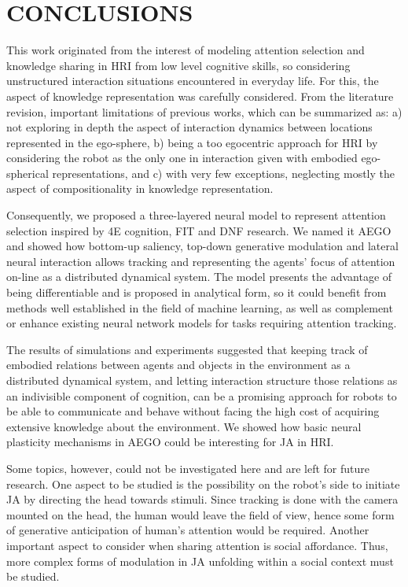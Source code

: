 \documentclass[letterpaper, 10 pt, conference]{ieeeconf}  %
\begin{document}
	\section{CONCLUSIONS}
	\label{sec:conclusions}
	
	This work originated from the interest of modeling attention selection and knowledge sharing in HRI from low level cognitive skills, so considering unstructured interaction situations encountered in everyday life. For this, the aspect of knowledge representation was carefully considered. From the literature revision, important limitations of previous works, which can be summarized as: a) not exploring in depth the aspect of interaction dynamics between locations represented in the ego-sphere, b) being a too egocentric approach for HRI by considering the robot as the only one in interaction given with embodied ego-spherical representations, and c) with very few exceptions, neglecting mostly the aspect of compositionality in knowledge representation.
	
	Consequently, we proposed a three-layered neural model to represent attention selection inspired by 4E cognition, FIT and DNF research. We named it AEGO and showed how bottom-up saliency, top-down generative modulation and lateral neural interaction allows tracking and representing the agents' focus of attention on-line as a distributed dynamical system. The model presents the advantage of being differentiable and is proposed in analytical form, so it could benefit from methods well established in the field of machine learning, as well as complement or enhance existing neural network models for tasks requiring attention tracking. 
	
	The results of simulations and experiments suggested that keeping track of embodied relations between agents and objects in the environment as a distributed dynamical system, and letting interaction structure those relations as an indivisible component of cognition, can be a promising approach for robots to be able to communicate and behave without facing the high cost of acquiring extensive knowledge about the environment. We showed how basic neural plasticity mechanisms in AEGO could be interesting for JA in HRI.
	
	Some topics, however, could not be investigated here and are left for future research. One aspect to be studied is the possibility on the robot's side to initiate JA by directing the head towards stimuli. Since tracking is done with the camera mounted on the head, the human would leave the field of view, hence some form of generative anticipation of human's attention would be required. Another important aspect to consider when sharing attention is social affordance. Thus, more complex forms of modulation in JA unfolding within a social context must be studied. 
	
\end{document}
